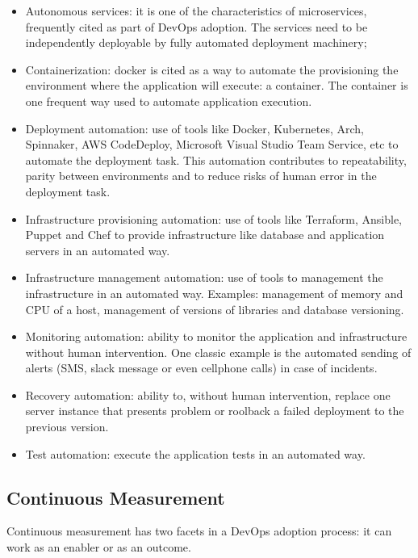 \begin{itemize}
\item Autonomous services: it is one of the characteristics of microservices, frequently cited as part of DevOps adoption. The services need to be  independently deployable by fully automated deployment machinery;

\item Containerization: docker is cited as a way to automate the provisioning the environment where the application will execute: a container. The container is one frequent way used to automate application execution.

\item Deployment automation: use of tools like Docker, Kubernetes, Arch, Spinnaker, AWS CodeDeploy, Microsoft Visual Studio Team Service, etc to automate the deployment task. This automation contributes to repeatability, parity between environments and to reduce risks of human error in the deployment task.

\item Infrastructure provisioning automation: use of tools like Terraform, Ansible, Puppet and Chef to provide infrastructure like database and application servers in an automated way.

\item Infrastructure management automation: use of tools to management the infrastructure in an automated way. Examples: management of memory and CPU of a host, management of versions of libraries and database versioning.

\item Monitoring automation: ability to monitor the application and infrastructure without human intervention. One classic example is the automated sending of alerts (SMS, slack message or even cellphone calls) in case of incidents.

\item Recovery automation: ability to, without human intervention, replace one server instance that presents problem or roolback a failed deployment to the previous version.

\item Test automation: execute the application tests in an automated way.
\end{itemize}

\subsection{Continuous Measurement}
Continuous measurement has two facets in a DevOps adoption process: it can work as an enabler or as an outcome.

